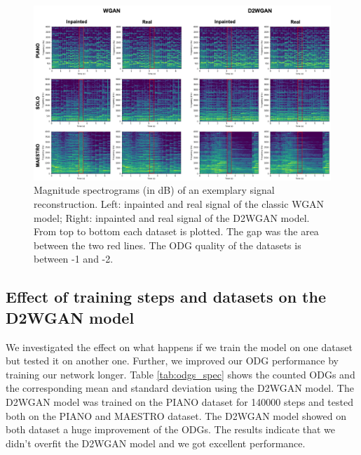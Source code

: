 \documentclass{article} %
\begin{document}
\begin{figure}[ht]
    \includegraphics[scale=0.124]{images/spectrograms.jpg}
    \centering
    \caption{Magnitude spectrograms (in dB) of an exemplary signal reconstruction. Left: inpainted and real signal of the classic WGAN model; Right: inpainted and real signal of the D2WGAN model. From top to bottom each dataset is plotted. The gap was the area between the two red lines. The ODG quality of the datasets is between -1 and -2.}
    \label{fig:spectrogram}
\end{figure}


\subsection{Effect of training steps and datasets on the D2WGAN model}\label{subsec:Effect of steps}
We investigated the effect on what happens if we train the model on one dataset but tested it on another one. Further, we improved our ODG performance by training our network longer. Table \ref{tab:odgs_spec} shows the counted ODGs and the corresponding mean and standard deviation using the D2WGAN model. The D2WGAN model was trained on the PIANO dataset for 140000 steps and tested both on the PIANO and MAESTRO dataset. The D2WGAN model showed on both dataset a huge improvement of the ODGs. The results indicate that we didn't overfit the D2WGAN model and we got excellent performance.
\end{document}

